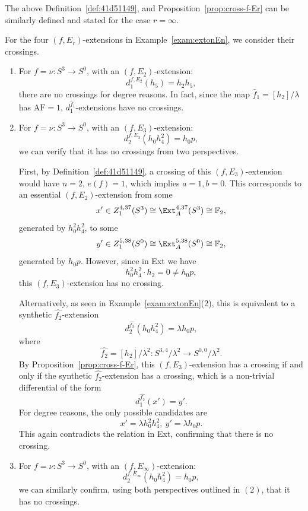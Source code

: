 \documentclass{amsart}
\numberwithin{equation}{section}
\newcommand{\AF}{\mathrm{AF}}
\begin{document}
The above Definition~\ref{def:41d51149}, and Proposition~\ref{prop:cross-f-Er} can be similarly defined and stated for the case $r=\infty$.  

\begin{example} \label{exam:Ercross}
    For the four $(f,E_r)$-extensions in Example~\ref{exam:extonEn}, we consider their crossings.
    \begin{enumerate}
        \item For $f = \nu: S^3 \rightarrow S^0$, with an $(f, E_2)$-extension:
        $$d_1^{f, E_2} (h_5) = h_2 h_5,$$
        there are no crossings for degree reasons. In fact, since the map $\hat{f}_1 = [h_2]/\lambda$ has $\AF=1$, $d_1^{\hat{f}_1}$-extensions have no crossings.

        \item For $f = \nu: S^3 \rightarrow S^0$, with an $(f, E_3)$-extension:
        $$d_2^{f, E_3} (h_0h_4^2) = h_0 p,$$
        we can verify that it has no crossings from two perspectives.
        
        First, by Definition~\ref{def:41d51149}, a crossing of this $(f, E_3)$-extension would have $n=2$, $e(f)=1$, which implies $a=1, b=0$. This corresponds to an essential $(f, E_2)$-extension from some 
        $$x' \in Z_1^{4,37}(S^3) \cong \Ext_A^{4, 37}(S^3) \cong \mathbb{F}_2,$$
        generated by $h_0^2h_4^2$, to some 
        $$y' \in Z_1^{5,38}(S^0) \cong \Ext_A^{5, 38}(S^0) \cong \mathbb{F}_2,$$
        generated by $h_0p$. However, since in Ext we have
        $$h_0^2 h_4^2 \cdot h_2 = 0 \neq h_0 p,$$
        this $(f, E_3)$-extension has no crossing.

        Alternatively, as seen in Example~\ref{exam:extonEn}(2), this is equivalent to a synthetic $\hat{f_{2}}$-extension
        $$d_2^{\hat{f_{2}}} (h_0h_4^2) = \lambda h_0 p,$$
        where 
        $$\hat{f_{2}} = [h_2]/\lambda^2: S^{3,4}/\lambda^2 \rightarrow S^{0,0}/\lambda^2.$$
        By Proposition~\ref{prop:cross-f-Er}, this $(f, E_3)$-extension has a crossing if and only if the synthetic $\hat{f_{2}}$-extension has a crossing, which is a non-trivial differential of the form
        $$d_1^{\hat{f_{2}}} (x') = y'.$$
        For degree reasons, the only possible candidates are $$x'= \lambda h_0^2 h_4^2, \ y' = \lambda h_0 p.$$ This again contradicts the relation in Ext, confirming that there is no crossing.

        \item For $f = \nu: S^3 \rightarrow S^0$, with an $(f, E_\infty)$-extension:
        $$d_2^{f, E_\infty} (h_0h_4^2) = h_0 p,$$
        we can similarly confirm, using both perspectives outlined in $(2)$, that it has no crossings.


\end{enumerate}
\end{example}
\end{document}
